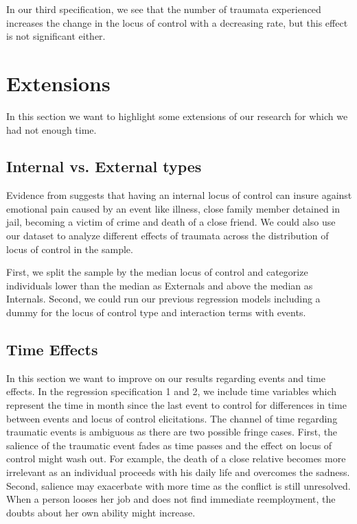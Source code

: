\documentclass[12pt, a4paper, fleqn, parskip]{scrartcl}
\begin{document}
In our third specification, we see that the number of traumata experienced
increases the change in the locus of control with a decreasing rate, but this
effect is not significant either.


\section{Extensions} %
\label{sec:extensions}

In this section we want to highlight some extensions of our research for which
we had not enough time.

\subsection{Internal vs. External types} %
\label{sub:internal_vs_external_types}

Evidence from \citet{buddelmeyer2016} suggests that having an internal locus of
control can insure against emotional pain caused by an event like illness,
close family member detained in jail, becoming a victim of crime and death of a
close friend. We could also use our dataset to analyze different effects of
traumata across the distribution of locus of control in the sample.

First, we split the sample by the median locus of control and categorize
individuals lower than the median as Externals and above the median as
Internals. Second, we could run our previous regression models including a
dummy for the locus of control type and interaction terms with events.


\subsection{Time Effects} %
\label{sub:time_effects}

In this section we want to improve on our results regarding events and time
effects. In the regression specification 1 and 2, we include time variables
which represent the time in month since the last event to control for
differences in time between events and locus of control elicitations. The
channel of time regarding traumatic events is ambiguous as there are two
possible fringe cases. First, the salience of the traumatic event fades as time
passes and the effect on locus of control might wash out. For example, the
death of a close relative becomes more irrelevant as an individual proceeds
with his daily life and overcomes the sadness. Second, salience may exacerbate
with more time as the conflict is still unresolved. When a person looses her
job and does not find immediate reemployment, the doubts about her own ability
might increase.
\end{document}
